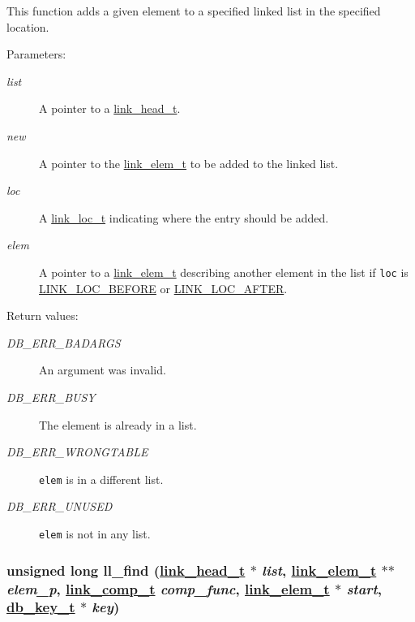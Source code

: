 This function adds a given element to a specified linked list in the specified location.\begin{Desc}
\item[Parameters: ]\par
\begin{description}
\item[{\em 
list}]A pointer to a \hyperlink{group__dbprim__link_a0}{link\_\-head\_\-t}. \item[{\em 
new}]A pointer to the \hyperlink{group__dbprim__link_a1}{link\_\-elem\_\-t} to be added to the linked list. \item[{\em 
loc}]A \hyperlink{group__dbprim__link_a4}{link\_\-loc\_\-t} indicating where the entry should be added. \item[{\em 
elem}]A pointer to a \hyperlink{group__dbprim__link_a1}{link\_\-elem\_\-t} describing another element in the list if {\tt loc} is \hyperlink{group__dbprim__link_a26a133}{LINK\_\-LOC\_\-BEFORE} or \hyperlink{group__dbprim__link_a26a134}{LINK\_\-LOC\_\-AFTER}.\end{description}
\end{Desc}
\begin{Desc}
\item[Return values: ]\par
\begin{description}
\item[{\em 
DB\_\-ERR\_\-BADARGS}]An argument was invalid. \item[{\em 
DB\_\-ERR\_\-BUSY}]The element is already in a list. \item[{\em 
DB\_\-ERR\_\-WRONGTABLE}]{\tt elem} is in a different list. \item[{\em 
DB\_\-ERR\_\-UNUSED}]{\tt elem} is not in any list. \end{description}
\end{Desc}
\hypertarget{group__dbprim__link_a9}{
\subsubsection[ll\_\-find]{\setlength{\rightskip}{0pt plus 5cm}unsigned long ll\_\-find (\hyperlink{group__dbprim__link_a0}{link\_\-head\_\-t} $\ast$ {\em list}, \hyperlink{group__dbprim__link_a1}{link\_\-elem\_\-t} $\ast$$\ast$ {\em elem\_\-p}, \hyperlink{group__dbprim__link_a3}{link\_\-comp\_\-t} {\em comp\_\-func}, \hyperlink{group__dbprim__link_a1}{link\_\-elem\_\-t} $\ast$ {\em start}, \hyperlink{group__dbprim_a0}{db\_\-key\_\-t} $\ast$ {\em key})}}
\label{group__dbprim__link_a9}


